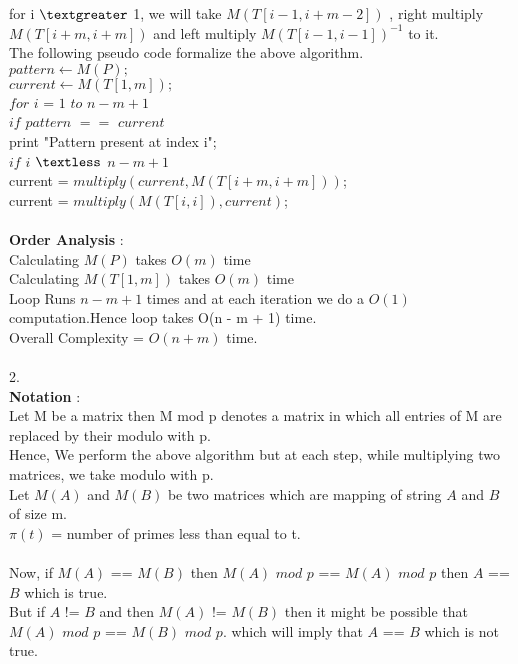 \documentclass{article}
\begin{document}
for i $\textgreater$ 1, we will take $M(T[i-1,i+m-2])$ , right multiply $M(T[i+m,i+m])$ and left multiply $M(T[i-1,i-1])^{-1}$ to it. \\ 
The following pseudo code formalize the above algorithm. \\
$ pattern \leftarrow M(P) ;$ \\
$ current \leftarrow M(T[1,m]) ; $ \\
$for $ $ i $ = $ 1 $ $to$ $ n - m + 1 $ \\
\hspace*{1cm}  $if$ $pattern$ $==$ $current $ \\ 
\hspace*{2cm} print "Pattern present at index i"; \\ 
\hspace*{1cm} $ if$ $i$ $\textless$ $n - m + 1 $ \\ 
\hspace*{2cm}  	current = $multiply(current,M(T[i+m,i+m]))$; \\ 
\hspace*{2cm}  	current = $multiply(M(T[i,i]),current)$; \\\\
\textbf{Order Analysis} :\\
Calculating $M(P)$ takes $O(m)$ time  \\
Calculating $M(T[1,m])$ takes $O(m)$ time \\
Loop Runs $n - m + 1$ times and at each iteration we do a $O(1)$ computation.Hence loop takes O(n - m + 1) time. \\ 
Overall Complexity = $O(n + m)$ time. \\\\
2. \\
\textbf{Notation} :  \\
Let M be a matrix then M mod p denotes a matrix in which all entries of M are replaced by their modulo with p.\\
Hence, We perform the above algorithm but at each step, while multiplying two matrices, we take modulo with p. \\
Let $M(A)$ and $M(B)$ be two matrices which are mapping of string $A$ and $B$ of size m. \\
$\pi(t)$ = number of primes less than equal to t. \\\\
Now, if $M(A)$ == $M(B)$ then $M(A)$ $mod$ $p$ == $M(A)$ $mod$ $p$ then $A$ == $B$ which is true. \\
But if $A$ != $B$ and then $M(A)$ != $M(B)$ then it might be possible that $M(A)$ $mod$ $p$ == $M(B)$ $mod$ $p$. which will imply that $A$ == $B$ which is not true. \\
\end{document}
